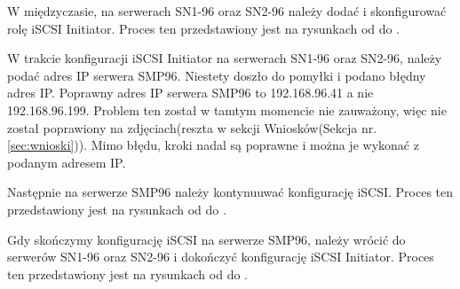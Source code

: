 
\clearpage

W międzyczasie, na serwerach SN1-96 oraz SN2-96 należy dodać i skonfigurować rolę iSCSI Initiator. Proces ten przedstawiony jest na rysunkach od  do .  


\clearpage



W trakcie konfiguracji iSCSI Initiator na serwerach SN1-96 oraz SN2-96, należy podać adres IP serwera SMP96. Niestety doszło do pomyłki i podano błędny adres IP. Poprawny adres IP serwera SMP96 to 192.168.96.41 a nie 192.168.96.199. Problem ten został w tamtym momencie nie zauważony, więc nie został poprawiony na zdjęciach(reszta w sekcji Wniosków(Sekcja nr.\ref{sec:wnioski})). Mimo błędu, kroki nadal są poprawne i można je wykonać z podanym adresem IP.

\clearpage

Następnie na serwerze SMP96 należy kontynuuwać konfigurację iSCSI. Proces ten przedstawiony jest na rysunkach od  do .


\clearpage


\clearpage


\clearpage


\clearpage

Gdy skończymy konfigurację iSCSI na serwerze SMP96, należy wrócić do serwerów SN1-96 oraz SN2-96 i dokończyć konfigurację iSCSI Initiator. Proces ten przedstawiony jest na rysunkach od  do .


